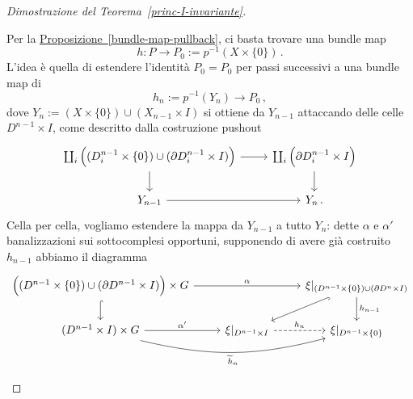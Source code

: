 \begin{proof}[Dimostrazione del Teorema~\ref{princ-I-invariante}]
\begin{itemize}
Per la \hyperref[bundle-map-pullback]{Proposizione~\ref{bundle-map-pullback}}, 
ci basta trovare una bundle map
\begin{equation*}
	h : P \to P_{0}:=p^{-1}(X \times \{0\})\,.
\end{equation*}
L'idea è quella di estendere l'identità $P_{0} = P_{0}$
per passi successivi a una bundle map di 
\begin{equation*}
	h_{n} := p^{-1}(Y_{n}) \longrightarrow P_{0}\,,
\end{equation*}
dove $Y_{n} := (X \times \{0\}) \cup (X_{n-1} \times I)$ 
si ottiene da $Y_{n-1}$ attaccando delle celle $D^{n-1} \times I$,
come descritto dalla costruzione pushout %
\begin{equation*}
	\begin{tikzcd}
		\coprod_{i} \Big( (D_{i}^{n-1} \times \{0\}) \cup (\de D_{i}^{n-1} \times I) \Big) \ar[r] \ar[d]
		& \coprod_{i} \Big( \de D_{i}^{n-1} \times I \Big) \ar[d] \\
		Y_{n-1} \ar[r] & Y_{n}\,.
	\end{tikzcd}
\end{equation*}
Cella per cella, vogliamo estendere la mappa da $Y_{n-1}$ a tutto $Y_{n}$:
dette $\alpha$ e $\alpha'$ banalizzazioni sui sottocomplesi opportuni,
supponendo di avere già costruito $h_{n-1}$ abbiamo il diagramma
\begin{equation*}
	\begin{tikzcd}
		\Big( (D^{n-1} \times \{0\}) \cup (\de D^{n-1} \times I) \Big) \times G 
		\ar[rr, "\alpha"] \ar[d, hook]
		& & \xi\vert_{(D^{n-1} \times \{0\}) \cup (\de D^{n} \times I) } 
		\ar[dl, hook] \ar[d, "h_{n-1}"] \\
		(D^{n-1} \times I) \times G \ar[r, "\alpha'"] \ar[rr, bend right=14, "\widetilde{h}_{n}"']
		& \xi\vert_{D^{n-1} \times I} \ar[r, "h_{n}", dashed]
		& \xi\vert_{D^{n-1} \times \{0\}}
	\end{tikzcd}
\end{equation*}


\end{itemize}
\end{proof}
